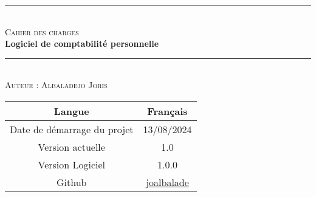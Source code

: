 \begin{titlepage}
    \centering
    \rule{\linewidth}{0.4mm} \\[1cm]
    \textsc{\LARGE Cahier des charges}\\[4cm]
    {\huge \bfseries Logiciel de comptabilité personnelle\\[1cm]}
    \rule{\linewidth}{0.4mm}\\[3cm]

    \textsc{\LARGE Auteur : Albaladejo Joris}\\[4.5cm]

    \begin{tabular}{|c|c|}
        \hline Langue & Français \\
        \hline Date de démarrage du projet & 13/08/2024 \\
        \hline Version actuelle & 1.0 \\
        \hline Version Logiciel & 1.0.0 \\
        \hline Github & \href{https://github.com/joalbalade}{joalbalade}\\
        \hline
    \end{tabular}

    
\end{titlepage}
